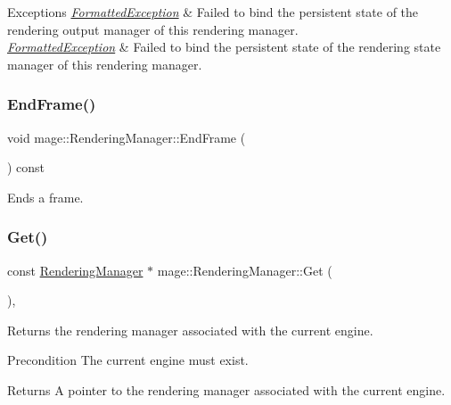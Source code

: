 \begin{DoxyExceptions}{Exceptions}
{\em \hyperlink{classmage_1_1_formatted_exception}{Formatted\+Exception}} & Failed to bind the persistent state of the rendering output manager of this rendering manager. \\
\hline
{\em \hyperlink{classmage_1_1_formatted_exception}{Formatted\+Exception}} & Failed to bind the persistent state of the rendering state manager of this rendering manager. \\
\hline
\end{DoxyExceptions}
\hypertarget{classmage_1_1_rendering_manager_ab4aee54db3d5249e0cc0848383b80dab}{}\label{classmage_1_1_rendering_manager_ab4aee54db3d5249e0cc0848383b80dab} 
\subsubsection{\texorpdfstring{End\+Frame()}{EndFrame()}}
{\footnotesize\ttfamily void mage\+::\+Rendering\+Manager\+::\+End\+Frame (\begin{DoxyParamCaption}{ }\end{DoxyParamCaption}) const}

Ends a frame. \hypertarget{classmage_1_1_rendering_manager_a920fdd741d160b687ecac1d892f8bfd1}{}\label{classmage_1_1_rendering_manager_a920fdd741d160b687ecac1d892f8bfd1} 
\subsubsection{\texorpdfstring{Get()}{Get()}}
{\footnotesize\ttfamily const \hyperlink{classmage_1_1_rendering_manager}{Rendering\+Manager} $\ast$ mage\+::\+Rendering\+Manager\+::\+Get (\begin{DoxyParamCaption}{ }\end{DoxyParamCaption})\hspace{0.3cm}{\ttfamily [static]}, {\ttfamily [noexcept]}}

Returns the rendering manager associated with the current engine.

\begin{DoxyPrecond}{Precondition}
The current engine must exist. 
\end{DoxyPrecond}
\begin{DoxyReturn}{Returns}
A pointer to the rendering manager associated with the current engine. 
\end{DoxyReturn}
\hypertarget{classmage_1_1_rendering_manager_a92dc62ffd2e86652edd86739ff878ac2}{}\label{classmage_1_1_rendering_manager_a92dc62ffd2e86652edd86739ff878ac2} 

